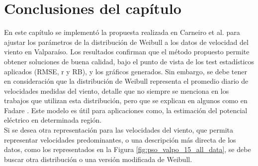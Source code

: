 \section{Conclusiones del capítulo}
En este capítulo se implementó la propuesta realizada en Carneiro et al. \cite{Carneiro15} para ajustar los parámetros de la distribución de Weibull a los datos de velocidad del viento en Valparaíso. Los resultados confirman que el método propuesto permite obtener soluciones de buena calidad, bajo el punto de vista de los test estadísticos aplicados (RMSE, r y RB), y los gráficos generados. Sin embargo, se debe tener en consideración que la distribución de Weibull representa el promedio diario de velocidades medidas del viento, detalle que no siempre se menciona en los trabajos que utilizan esta distribución, pero que se explican en algunos como en Fadare \cite{Fadare08}. Este modelo es útil para aplicaciones como, la estimación del potencial eléctrico en determinada región.\\
Si se desea otra representación para las velocidades del viento, que permita representar velocidades predominantes, o una descripción más directa de los datos, como los representados en la Figura \ref{fig:pso_valpo_15_all_data}, se debe buscar otra distribución o una versión modificada de Weibull.